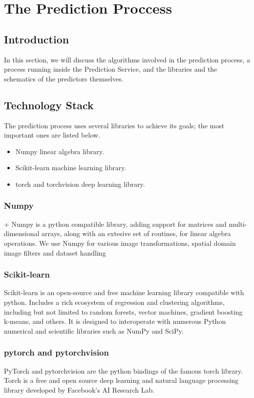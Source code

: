 \chapter{The Prediction Proccess}
\label{prediction-process}
	\section{Introduction}
		In this section, we will discuss the algorithms involved in the prediction process, a process running inside the Prediction Service, 
		and the libraries and the schematics of the predictors themselves.
	\section{Technology Stack}
		The prediction process uses several libraries to achieve its goals; the most important ones are listed below.
		\begin{itemize}
			\item Numpy linear algebra library.
			\item Scikit-learn machine learning library.
			\item torch and torchvision deep learning library.
		\end{itemize}
		\subsection{Numpy}+
			\label{numpy}
			Numpy is a python compatible library, adding support for matrices and multi-dimensional arrays, along with an 
			extesive set of routines, for linear algebra operations. We use Numpy for various image transformations, spatial 
			domain image filters and dataset handling
		\subsection{Scikit-learn}
			Scikit-learn is an open-source and free machine learning library compatible with python. Includes a rich 
			ecosystem of regression and clustering algorithms, including but not limited to random forests, vector machines, 
			gradient boosting k-means, and others. It is designed to interoperate with numerous Python numerical and scientific 
			libraries such as NumPy and SciPy.
		\subsection{pytorch and pytorchvision}
			PyTorch and pytorchvision are the python bindings of the famous torch library. Torch is a free and 
			open source deep learning and natural language processing library developed by Facebook's AI Research Lab.
